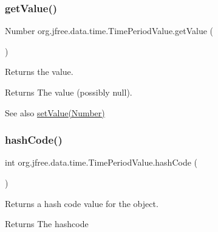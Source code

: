 \subsubsection{\texorpdfstring{get\+Value()}{getValue()}}
{\footnotesize\ttfamily Number org.\+jfree.\+data.\+time.\+Time\+Period\+Value.\+get\+Value (\begin{DoxyParamCaption}{ }\end{DoxyParamCaption})}

Returns the value.

\begin{DoxyReturn}{Returns}
The value (possibly {\ttfamily null}).
\end{DoxyReturn}
\begin{DoxySeeAlso}{See also}
\mbox{\hyperlink{classorg_1_1jfree_1_1data_1_1time_1_1_time_period_value_a9ad181683e60a30e7aca9ae087710301}{set\+Value(\+Number)}} 
\end{DoxySeeAlso}
\mbox{\label{classorg_1_1jfree_1_1data_1_1time_1_1_time_period_value_ae1a068483a9951b4a048e82bf4ad4e81}} 
\subsubsection{\texorpdfstring{hash\+Code()}{hashCode()}}
{\footnotesize\ttfamily int org.\+jfree.\+data.\+time.\+Time\+Period\+Value.\+hash\+Code (\begin{DoxyParamCaption}{ }\end{DoxyParamCaption})}

Returns a hash code value for the object.

\begin{DoxyReturn}{Returns}
The hashcode 
\end{DoxyReturn}
\mbox{\label{classorg_1_1jfree_1_1data_1_1time_1_1_time_period_value_a9ad181683e60a30e7aca9ae087710301}} 
